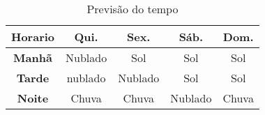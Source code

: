 \begin{table}[hb]
    \begin{tabular}{ | c |c c c c| }
        \hline
        \textbf{Horario} & \textbf{Qui.} & \textbf{Sex.} & \textbf{Sáb}. & \textbf{Dom.} \\
        \hline
    
        \textbf{Manhã} & Nublado & Sol & Sol & Sol \\

        \textbf{Tarde} & nublado & Nublado & Sol & Sol \\

        \textbf{Noite} & Chuva & Chuva & Nublado & Chuva \\
        \hline
    
    \end{tabular}
    \caption{Previsão do  tempo}
\end{table}